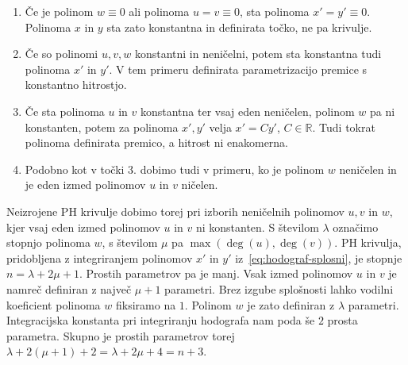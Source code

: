 \documentclass[isrm2, tisk]{fmfdelo}
\newcommand{\R}{\mathbb R}
\newcommand{\mycomment}[1]{\textbf{\textcolor{red}{#1}}}
\begin{document}
    \begin{enumerate}[wide, labelwidth=!, labelindent=10pt]
        \itemsep0em
        \item  Če je polinom $w\equiv 0$ ali polinoma $u=v \equiv 0$, sta polinoma $x'=y'\equiv 0$.
        Polinoma $x$ in $y$ sta zato konstantna in definirata točko, ne pa krivulje.
        \item  Če so polinomi $u,v,w$ konstantni in neničelni, potem sta konstantna tudi polinoma $x'$ in $y'$.
        V tem primeru definirata parametrizacijo premice s konstantno hitrostjo.
        \item  Če sta polinoma $u$ in $v$ konstantna ter vsaj eden neničelen, polinom $w$ pa ni konstanten, potem za polinoma $x',y'$ velja $x'=Cy'$, $C\in \R$.
        Tudi tokrat polinoma definirata premico, a hitrost ni enakomerna.
        \item Podobno kot v točki 3. dobimo tudi v primeru, ko je polinom $w$ neničelen in je eden izmed polinomov $u$ in $v$ ničelen.
    \end{enumerate}
    \noindent Neizrojene PH krivulje dobimo torej pri izborih neničelnih polinomov $u,v$ in $w$, kjer vsaj eden izmed polinomov $u$ in $v$ ni konstanten.
    S številom $\lambda$ označimo stopnjo polinoma $w$, s številom $\mu$ pa $\max(\deg(u),\deg(v))$.
    PH krivulja, pridobljena z integriranjem polinomov $x'$ in $y'$ iz~\eqref{eq:hodograf-splosni}, je stopnje $n=\lambda + 2\mu + 1$.
    Prostih parametrov pa je manj.
    Vsak izmed polinomov $u$ in $v$ je namreč definiran z največ $\mu + 1$ parametri.
    Brez izgube splošnosti lahko vodilni koeficient polinoma $w$ fiksiramo na $1$.
    Polinom $w$ je zato definiran z $\lambda$ parametri.
    Integracijska konstanta pri integriranju hodografa nam poda še $2$ prosta parametra.
    Skupno je prostih parametrov torej $\lambda + 2(\mu+1)+2=\lambda + 2\mu+4 = n+3$.
\end{document}
